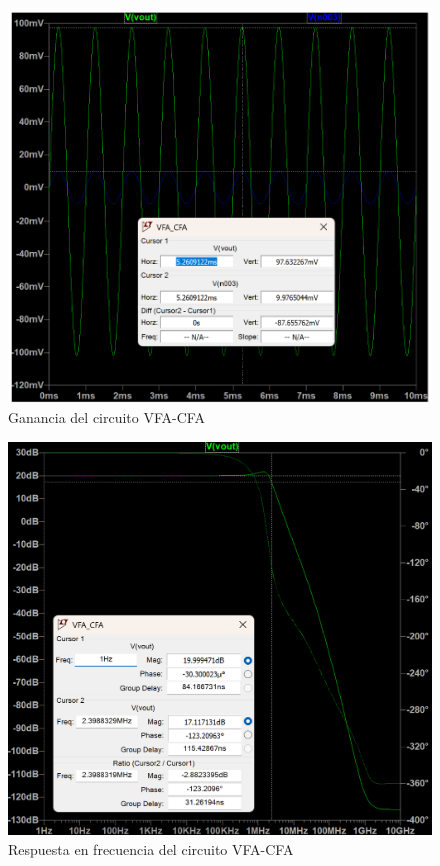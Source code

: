 \documentclass[a4paper,12pt]{article}
\begin{document}
\begin{figure}
    \centering
    \includegraphics[width=0.7\linewidth]{Ganancia_circuito2.png}
    \caption{Ganancia del circuito VFA-CFA}
    \label{fig:enter-label}
\end{figure}
\begin{figure}
    \centering
    \includegraphics[width=0.7\linewidth]{RTA_VFA-CFA-I.png}
    \caption{Respuesta en frecuencia del circuito VFA-CFA}
    \label{fig:enter-label}
\end{figure}
\newpage
\end{document}
